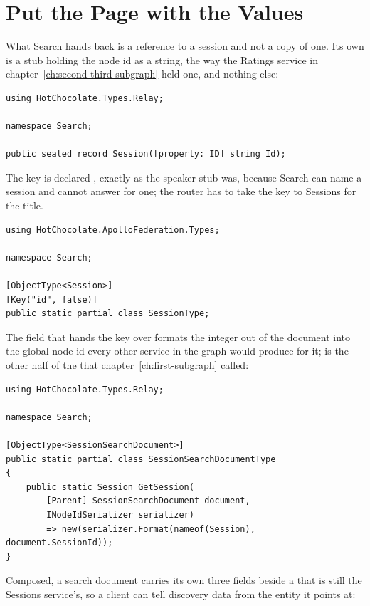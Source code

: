 \section{Put the Page with the Values}
\label{sec:ch13-put-page-with-values}

%
What Search hands back is a reference to a session and not a copy of one. Its
own  is a stub holding the node id as a string, the way the
Ratings service in chapter~\ref{ch:second-third-subgraph} held one, and
nothing else:

\begin{verbatim}
using HotChocolate.Types.Relay;

namespace Search;

public sealed record Session([property: ID] string Id);
\end{verbatim}

The key is declared , exactly as the speaker stub was,
because Search can name a session and cannot answer for one; the router has to
take the key to Sessions for the title.

\begin{verbatim}
using HotChocolate.ApolloFederation.Types;

namespace Search;

[ObjectType<Session>]
[Key("id", false)]
public static partial class SessionType;
\end{verbatim}

%
The field that hands the key over formats the integer out of the document into
the global node id every other service in the graph would produce for it;
 is the other half of the  that
chapter~\ref{ch:first-subgraph} called:

\begin{verbatim}
using HotChocolate.Types.Relay;

namespace Search;

[ObjectType<SessionSearchDocument>]
public static partial class SessionSearchDocumentType
{
    public static Session GetSession(
        [Parent] SessionSearchDocument document,
        INodeIdSerializer serializer)
        => new(serializer.Format(nameof(Session), document.SessionId));
}
\end{verbatim}

Composed, a search document carries its own three fields beside a
 that is still the Sessions service's, so a client can tell
discovery data from the entity it points at:


